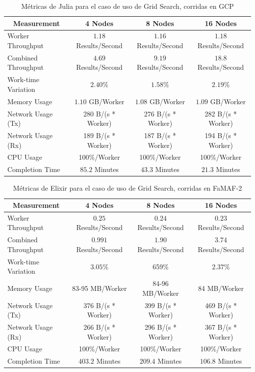 \documentclass[11pt]{article}
\newcommand{\gscap}[2]{\caption{Métricas de #1 para el caso de uso de Grid Search, corridas en #2}}
\begin{document}
\begin{table}[H]
\centering
\begin{tabular}{|l|c|c|c|}
\hline
\multicolumn{1}{|c|}{Measurement} & 4 Nodes & 8 Nodes & 16 Nodes \\ \hline
Worker Throughput & $1.18$ Results/Second & $1.16$ Results/Second & $1.18$ Results/Second \\ \hline
Combined Throughput & $4.69$ Results/Second & $9.19$ Results/Second & $18.8$ Results/Second \\ \hline
Work-time Variation & $2.40\%$& $1.58\%$& $2.19\%$\\ \hline
Memory Usage & $1.10$ GB/Worker & $1.08$ GB/Worker & $1.09$ GB/Worker \\ \hline
Network Usage (Tx) & 280 B/(s * Worker) & 276 B/(s * Worker) & 282 B/(s * Worker) \\ \hline
Network Usage (Rx) & 189 B/(s * Worker) & 187 B/(s * Worker) & 194 B/(s * Worker) \\ \hline
CPU Usage & 100\%/Worker & 100\%/Worker & 100\%/Worker \\ \hline
Completion Time & $85.2$ Minutes & $43.3$ Minutes & $21.3$ Minutes \\ \hline
\end{tabular}
\gscap{Julia}{GCP}
\end{table}

\begin{table}[H]
\centering
\begin{tabular}{|l|c|c|c|}
\hline
\multicolumn{1}{|c|}{Measurement} & 4 Nodes & 8 Nodes & 16 Nodes \\ \hline
Worker Throughput & $0.25$ Results/Second & $0.24$ Results/Second & $0.23$ Results/Second \\ \hline
Combined Throughput & $0.991$ Results/Second & $1.90$ Results/Second & $3.74$ Results/Second \\ \hline
Work-time Variation & $3.05\%$& 659\% & $2.37\%$\\ \hline
Memory Usage & 83-95 MB/Worker & 84-96 MB/Worker & 84 MB/Worker \\ \hline
Network Usage (Tx) & 376 B/(s * Worker) & 399 B/(s * Worker) & 469 B/(s * Worker) \\ \hline
Network Usage (Rx) & 266 B/(s * Worker) & 296 B/(s * Worker) & 367 B/(s * Worker) \\ \hline
CPU Usage & 100\%/Worker & 100\%/Worker & 100\%/Worker \\ \hline
Completion Time & $403.2$ Minutes & $209.4$ Minutes & $106.8$ Minutes \\ \hline
\end{tabular}
\gscap{Elixir}{FaMAF-2}
\end{table}
\end{document}
